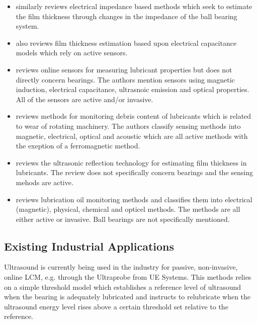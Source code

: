 \begin{itemize}
    \item \cite{becker-dombrowsky_electrical_2024} similarly reviews electrical impedance based methods which seek to estimate the film thickness through changes in the impedance of the ball bearing system.
    \item \cite{dai_situ_2024} also reviews film thickness estimation based upon electrical capacitance models which rely on active sensors.
    \item \cite{zhu_lubricating_2017} reviews online sensors for measuring lubricant properties but does not directly concern bearings. The authors mention sensors using magnetic induction, electrical capacitance, ultrasnoic emission and optical properties. All of the sensors are active and/or invasive.
    \item \cite{sun_online_2021} reviews methods for monitoring debris content of lubricants which is related to wear of rotating machinery. The authors classify sensing methods into magnetic, electrical, optical and acoustic which are all active methods with the exeption of a ferromagnetic method.
    \item \cite{dou_review_2022} reviews the ultrasonic reflection technology for estimating film thickness in lubricants. The review does not specifically concern bearings and the sensing mehods are active.
    \item \cite{zhu_survey_2013} reviews lubrication oil monitoring methods and classifies them into electrical (magnetic), physical, chemical and opticel methods. The methods are all either active or invasive. Ball bearings are not specifically mentioned.
\end{itemize}

\subsection{Existing Industrial Applications}
Ultrasound is currently being used in the industry for passive, non-invasive, online LCM, e.g. through the Ultraprobe from UE Systems. This methods relies on a simple threshold model which establishes a reference level of ultrasound when the bearing is adequately lubricated and instructs to relubricate when the ultrasound energy level rises above a certain threshold set relative to the reference.